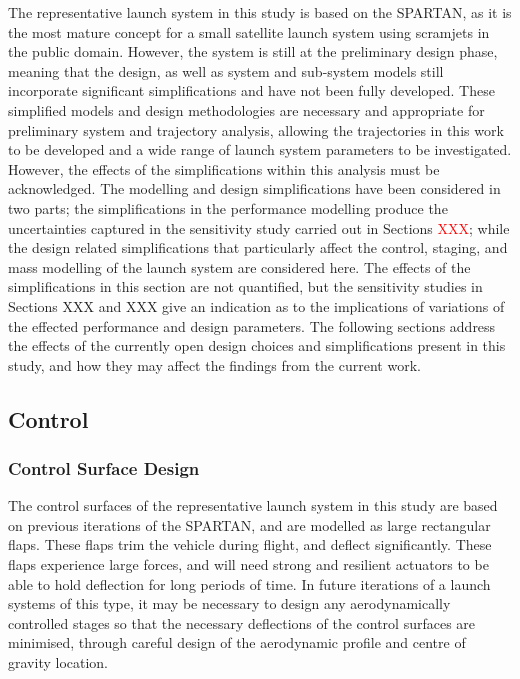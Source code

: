 The representative launch system in this study is based on the SPARTAN\cite{Preller2017b}, as it is the most mature concept for a small satellite launch system using scramjets in the public domain. However, the system is still at the preliminary design phase, meaning that the design, as well as system and sub-system models still incorporate significant simplifications and have not been fully developed. These simplified models and design methodologies are necessary and appropriate for preliminary system and trajectory analysis, allowing the trajectories in this work to be developed and a wide range of launch system parameters to be investigated. However, the effects of the simplifications within this analysis must be acknowledged.
The modelling and design simplifications have been considered in two parts; the simplifications in the performance modelling produce the uncertainties captured in the sensitivity study carried out in Sections \textcolor{red}{XXX}; while the design related simplifications that particularly affect the control, staging, and mass modelling of the launch system are considered here. The effects of the simplifications in this section are not quantified, but the sensitivity studies in Sections XXX and XXX give an indication as to the implications of variations of the effected performance and design parameters.
The following sections address the effects of the currently open design choices and simplifications present in this study, and how they may affect the findings from the current work. 

\subsection{Control}


\subsubsection{Control Surface Design}


The control surfaces of the representative launch system in this study are based on previous iterations of the SPARTAN\cite{Preller2017b}, and are modelled as large rectangular flaps. These flaps trim the vehicle during flight, and deflect significantly. These flaps experience large forces, and will need strong and resilient actuators to be able to hold deflection for long periods of time. In future iterations of a launch systems of this type, it may be necessary to design any aerodynamically controlled stages so that the necessary deflections of the control surfaces are minimised, through careful design of the aerodynamic profile and centre of gravity location.

